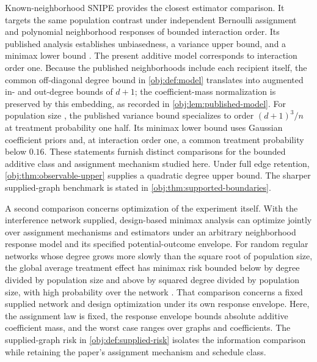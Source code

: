 \documentclass[11pt]{article}
\begin{document}
Known-neighborhood SNIPE provides the closest estimator comparison. It targets the same population contrast under independent Bernoulli assignment and polynomial neighborhood responses of bounded interaction order. Its published analysis establishes unbiasedness, a variance upper bound, and a minimax lower bound \citep[Sections 3--5; Theorems 1--2]{CortezRodriguezEichhornYu2023SNIPE}. The present additive model corresponds to interaction order one. Because the published neighborhoods include each recipient itself, the common off-diagonal degree bound  in \cref{obj:def:model} translates into augmented in- and out-degree bounds of \(d+1\); the coefficient-mass normalization is preserved by this embedding, as recorded in \cref{obj:lem:published-model}. For population size , the published variance bound specializes to order \((d+1)^3/n\) at treatment probability one half. Its minimax lower bound uses Gaussian coefficient priors and, at interaction order one, a common treatment probability below \(0.16\). These statements furnish distinct comparisons for the bounded additive class and assignment mechanism studied here. Under full edge retention, \cref{obj:thm:observable-upper} supplies a quadratic degree upper bound. The sharper supplied-graph benchmark is stated in \cref{obj:thm:supported-boundaries}.

A second comparison concerns optimization of the experiment itself. With the interference network supplied, design-based minimax analysis can optimize jointly over assignment mechanisms and estimators under an arbitrary neighborhood response model and its specified potential-outcome envelope. For random regular networks whose degree grows more slowly than the square root of population size, the global average treatment effect has minimax risk bounded below by degree divided by population size and above by squared degree divided by population size, with high probability over the network \citep[Corollary 5.4]{KandirosHarshawSavje2026DesignBasedMinimax}. That comparison concerns a fixed supplied network and design optimization under its own response envelope. Here, the assignment law is fixed, the response envelope bounds absolute additive coefficient mass, and the worst case ranges over graphs and coefficients. The supplied-graph risk in \cref{obj:def:supplied-risk} isolates the information comparison while retaining the paper's assignment mechanism and schedule class.
\end{document}
